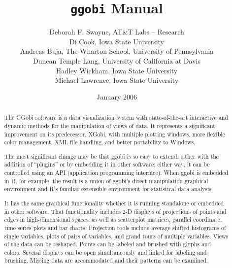 \documentclass[11pt]{article}
\begin{document}
\title {{\tt ggobi} Manual}
\author{
Deborah F. Swayne, AT\&T Labs -- Research \\
Di Cook, Iowa State University \\
Andreas Buja, The Wharton School, University of Pennsylvania \\
Duncan Temple Lang, University of California at Davis \\
Hadley Wickham, Iowa State University \\
Michael Lawrence, Iowa State University 
}

\date{January 2006}

\maketitle

\begin{abstract}

The GGobi software is a data visualization system with state-of-the-art
interactive and dynamic methods for the manipulation of views of
data.  It represents a significant improvement on its predecessor, XGobi,
with multiple plotting windows, more flexible color management, XML file
handling, and better portability to Windows.

The most significant change may be that ggobi is so easy to extend, either
with the addition of ``plugins'' or by embedding it in other software;
either way, it can be controlled using an API (application programming
interface).  When ggobi is embedded in R, for example, the result is a
union of ggobi's direct manipulation graphical environment
and R's familiar extensible environment for statistical data analysis.

It has the same graphical functionality whether it is running
standalone or embedded in other software.  That functionality includes
2-D displays of projections of points and edges in high-dimensional
spaces, as well as scatterplot matrices, parallel coordinate, time
series plots and bar charts.  Projection tools include average shifted
histograms of single variables, plots of pairs of variables, and grand
tours of multiple variables.  Views of the data can be reshaped.
Points can be labeled and brushed with glyphs and colors.  Several
displays can be open simultaneously and linked for labeling and
brushing.  Missing data are accommodated and their patterns can be
examined.
\end{abstract}

\newpage

\tableofcontents
\newpage
\end{document}
